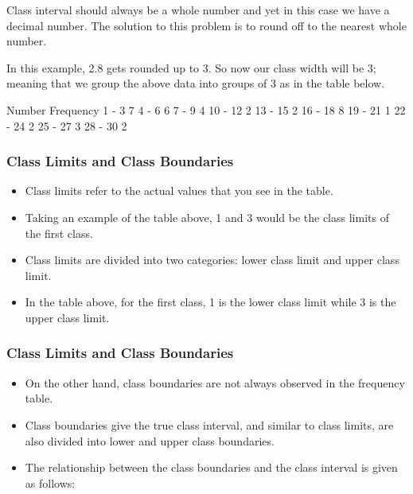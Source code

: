 \documentclass{beamer}
\begin{document}
\begin{frame}


Class interval should always be a whole number and yet in this case we have a decimal number. The solution to this problem is to round off to the nearest whole number.

In this example, 2.8 gets rounded up to 3. So now our class width will be 3; meaning that we group the above data into groups of 3 as in the table below.


\end{frame}
\begin{frame}

Number	 Frequency
1 - 3	 7
4 - 6	 6
7 - 9	 4
10 - 12	 2
13 - 15	 2
16 - 18	 8
19 - 21	 1
22 - 24	 2
25 - 27	 3
28 - 30	 2


\end{frame}
\begin{frame}
\frametitle{Class Limits and Class Boundaries}
\Large
\vspace{-1cm}
\begin{itemize}
\item 
Class limits refer to the actual values that you see in the table. 
\item Taking an example of the table above, 1 and 3 would be the class limits of the first class. 
\item 
Class limits are divided into two categories: lower class limit and upper class limit. \item In the table above, for the first class, 1 is the lower class limit while 3 is the upper class limit.
\end{itemize}
\end{frame}
\begin{frame}
\frametitle{Class Limits and Class Boundaries}
\Large
\vspace{-1cm}
\begin{itemize}
\item On the other hand, class boundaries are not always observed in the frequency table.
\item  Class boundaries give the true class interval, and similar to class limits, are also divided into lower and upper class boundaries.

\item The relationship between the class boundaries and the class interval is given as follows:
\end{itemize}

\end{frame}
\end{document}
